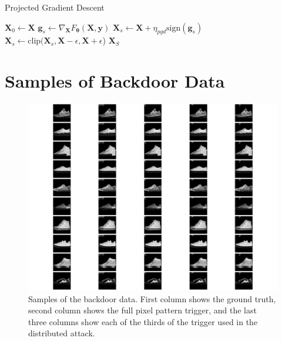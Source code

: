 \documentclass[conference,compsoc]{IEEEtran}
\begin{document}
\begin{algorithm}[H]
\caption{Projected Gradient Descent}
\label{alg:pgd}
\begin{algorithmic}[1]
        \State $\bm{X}_0 \gets \bm{X}$
            \State $\bm{g}_s \gets \nabla_{\bm{X}} F_{\bm{\theta}}(\bm{X}, \bm{y})$
            \State $\bm{X}_s \gets \bm{X} + \eta_{pgd} \text{sign}(\bm{g}_s)$
            \State $\bm{X}_s \gets \text{clip}(\bm{X}_s, \bm{X} - \epsilon, \bm{X} + \epsilon$)
        \EndFor
        \State \Return $\bm{X}_S$
    \EndFunction
\end{algorithmic}
\end{algorithm}


\section{Samples of Backdoor Data}\label{sec:triggers}

\begin{figure}[H]
    \centering
    \includegraphics[width=\columnwidth]{images/triggers.pdf}
    \caption{Samples of the backdoor data. First column shows the ground truth, second column shows the full pixel pattern trigger, and the last three columns show each of the thirds of the trigger used in the distributed attack.}
    \label{fig:triggers}
\end{figure}
\end{document}
